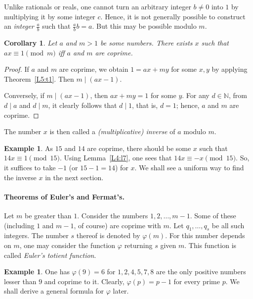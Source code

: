 \documentclass[12pt,notitlepage]{article}
\theoremstyle{plain}
\newtheorem{corr}[thm]{Corollary}
\theoremstyle{definition}
\newtheorem{exm}[thm]{Example}
\theoremstyle{plain}
\newcommand{\N}{\mathbb{N}}
\renewcommand{\phi}{\varphi}
\newcommand{\1}{\mathbf{1}}
\newcommand{\0}{\mathbf{0}}
\newcommand{\dvd}{\mathop{\mid}}
\begin{document}
Unlike rationals or reals, one cannot turn an arbitrary integer $b \neq 0$ into $1$ by multiplying it by some integer $c$. Hence, it is not generally possible to construct an \emph{integer} $\frac{a}{b}$ such that $\frac{a}{b} b = a$. But this may be possible modulo $m$.
\begin{corr}\label{L5:c2}
Let $a$ and $m > 1$ be some numbers. There exists $x$ such that $a x \equiv 1 \pmod m$ iff $a$ and $m$ are coprime.
\end{corr}
\begin{proof}
If $a$ and $m$ are coprime, we obtain $1 = a x + m y$ for some $x, y$ by applying Theorem~\ref{L5:t1}. Then $m \dvd (a x - 1)$.

Conversely, if $m \dvd (a x - 1)$, then $ax + m y = 1$ for some $y$. For any $d \in \N$, from $d \dvd a$ and $d \dvd m$, it clearly follows that $d \dvd 1$, that is, $d = 1$; hence, $a$ and $m$ are coprime.
\end{proof}
\noindent The number $x$ is then called a \emph{(multiplicative) inverse} of $a$ modulo $m$.
\begin{exm}
As $15$ and $14$ are coprime, there should be some $x$ such that $14 x \equiv 1 \pmod {15}$. Using Lemma~\ref{L4:l7}, one sees that $14 x \equiv -x \pmod {15}$. So, it suffices to take $-1$ (or $15 - 1 = 14$) for $x$. We shall see a uniform way to find the inverse $x$ in the next section.
\end{exm}


\paragraph{Theorems of Euler's and Fermat's.} Let $m$ be greater than $1$. Consider the numbers $1, 2, \ldots, m - 1$. Some of these (including $1$ and $m-1$, of course) are coprime with $m$. Let $q_1, \ldots, q_s$ be all such integers. The number $s$ thereof is denoted by $\phi(m)$. For this number depends on $m$, one may consider the function $\phi$ returning $s$ given $m$. This function is called \emph{Euler's totient function}.

\begin{exm}
One has $\phi(9) = 6$ for $1, 2, 4, 5, 7, 8$ are the only positive numbers lesser than $9$ and coprime to it. Clearly, $\phi(p) = p - 1$ for every prime $p$. We shall derive a general formula for $\phi$ later.
\end{exm}
\end{document}

